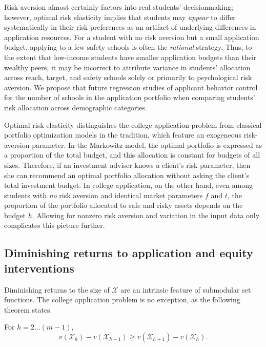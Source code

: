 Risk aversion almost certainly factors into real students' decisionmaking; however, optimal risk elasticity implies that students may \emph{appear} to differ systematically in their risk preferences as an artifact of underlying differences in application resources. For a student with no risk aversion but a small application budget, applying to a few safety schools is often the \emph{rational} strategy. Thus, to the extent that low-income students have smaller application budgets than their wealthy peers, it may be incorrect to attribute variance in students' allocation across reach, target, and safety schools solely or primarily to psychological risk aversion. We propose that future regression studies of applicant behavior control for the number of schools in the application portfolio when comparing students' risk allocation across demographic categories.

Optimal risk elasticity distinguishes the college application problem from classical portfolio optimization models in the \cite{markowitz1952} tradition, which feature an exogeneous risk-aversion parameter. In the Markowitz model, the optimal portfolio is expressed as a proportion of the total budget, and this allocation is constant for budgets of all sizes. Therefore, if an investment adviser knows a client's risk parameter, then she can recommend an optimal portfolio allocation without asking the client's total investment budget. In college application, on the other hand, even among students with \emph{no} risk aversion and identical market parameters $f$ and $t$, the proportion of the portfolio allocated to safe and risky assets depends on the budget $h$. Allowing for nonzero risk aversion and variation in the input data only complicates this picture further.

\subsection{Diminishing returns to application and equity interventions}

Diminishing returns to the size of $\mathcal{X}$ are an intrinsic feature of submodular set functions. The college application problem is no exception, as the following theorem states.

\begin{theorem} \label{concavityinh}
For $h = 2 \dots (m-1)$,
\begin{equation*}
v(\mathcal{X}_h) - v(\mathcal{X}_{h-1}) \geq v(\mathcal{X}_{h+1}) - v(\mathcal{X}_{h}).
\end{equation*} 
\end{theorem}

